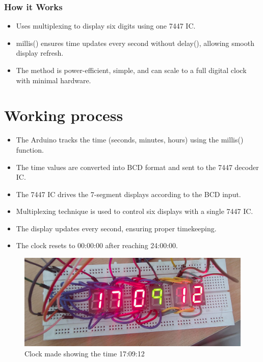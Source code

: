 \documentclass{article}
\begin{document}
\subsubsection{How it Works}
\begin{itemize}
    \item Uses multiplexing to display six digits using one 7447 IC.
    \item millis() ensures time updates every second without delay(), allowing smooth display refresh.
    \item The method is power-efficient, simple, and can scale to a full digital clock with minimal hardware.
\end{itemize}
\section{Working process }

\begin{itemize}
\item The Arduino tracks the time (seconds, minutes, hours) using the millis() function.
\item The time values are converted into BCD format and sent to the 7447 decoder IC.
\item The 7447 IC drives the 7-segment displays according to the BCD input.
\item Multiplexing technique is used to control six displays with a single 7447 IC.
\item The display updates every second, ensuring proper timekeeping.
\item The clock resets to 00:00:00 after reaching 24:00:00.
\end{itemize}

\begin{figure}[H]
    \centering
    \includegraphics[width=0.5\linewidth]{WhatsApp Image 2025-03-22 at 9.20.31 PM.jpeg}
    \caption{Clock made showing the time 17:09:12}
\end{figure}
\end{document}
